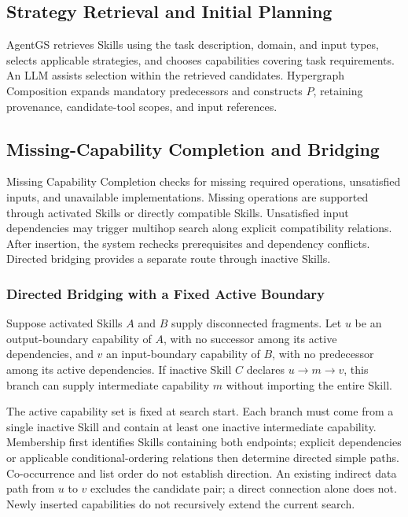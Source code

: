 \subsection{Strategy Retrieval and Initial Planning}
AgentGS retrieves Skills using the task description, domain, and input types, selects applicable strategies, and chooses capabilities covering task requirements. An LLM assists selection within the retrieved candidates. Hypergraph Composition expands mandatory predecessors and constructs $P$, retaining provenance, candidate-tool scopes, and input references.

\subsection{Missing-Capability Completion and Bridging}
\label{sec:completion}
Missing Capability Completion checks for missing required operations, unsatisfied inputs, and unavailable implementations. Missing operations are supported through activated Skills or directly compatible Skills. Unsatisfied input dependencies may trigger multihop search along explicit compatibility relations. After insertion, the system rechecks prerequisites and dependency conflicts. Directed bridging provides a separate route through inactive Skills.

\subsubsection{Directed Bridging with a Fixed Active Boundary}
Suppose activated Skills $A$ and $B$ supply disconnected fragments. Let $u$ be an output-boundary capability of $A$, with no successor among its active dependencies, and $v$ an input-boundary capability of $B$, with no predecessor among its active dependencies. If inactive Skill $C$ declares $u\to m\to v$, this branch can supply intermediate capability $m$ without importing the entire Skill.

The active capability set is fixed at search start. Each branch must come from a single inactive Skill and contain at least one inactive intermediate capability. Membership first identifies Skills containing both endpoints; explicit dependencies or applicable conditional-ordering relations then determine directed simple paths. Co-occurrence and list order do not establish direction. An existing indirect data path from $u$ to $v$ excludes the candidate pair; a direct connection alone does not. Newly inserted capabilities do not recursively extend the current search.

